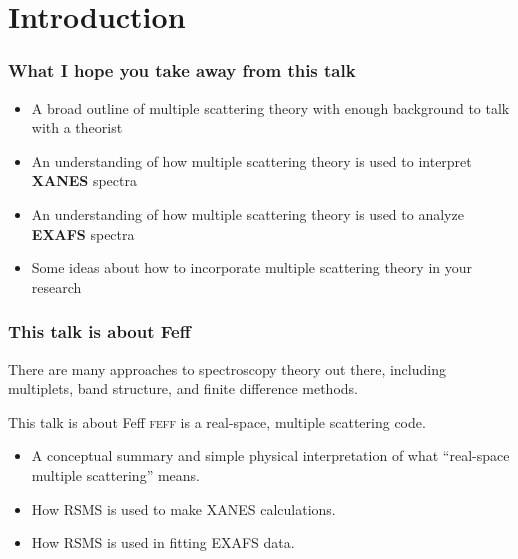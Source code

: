 \documentclass[10pt, xcolor=x11names, compress]{beamer}
\begin{document}
\section{Introduction}

\begin{frame}
  \frametitle{What I hope you take away from this talk}
  \begin{itemize}
  \item A broad outline of multiple scattering theory with enough
    background to talk with a theorist
  \item An understanding of how multiple scattering theory is used to
    interpret \textbf{XANES} spectra
  \item An understanding of how multiple scattering theory is used to
    analyze \textbf{EXAFS} spectra
  \item Some ideas about how to incorporate multiple scattering theory
    in your research
  \end{itemize}
\end{frame}

\begin{frame}
  \frametitle{This talk is about Feff}

  There are many approaches to spectroscopy theory out there,
  including multiplets, band structure, and finite difference methods.

  \bigskip

  \begin{exampleblock}{This talk is about Feff}
    \textsc{feff} is a real-space, multiple scattering code.
  \end{exampleblock}
  
  \bigskip

  \begin{itemize}
  \item A conceptual summary and simple physical interpretation of
    what ``real-space multiple scattering'' means.
  \item How RSMS is used to make XANES calculations.
  \item How RSMS is used in fitting EXAFS data.
  \end{itemize}
\end{frame}
\end{document}
